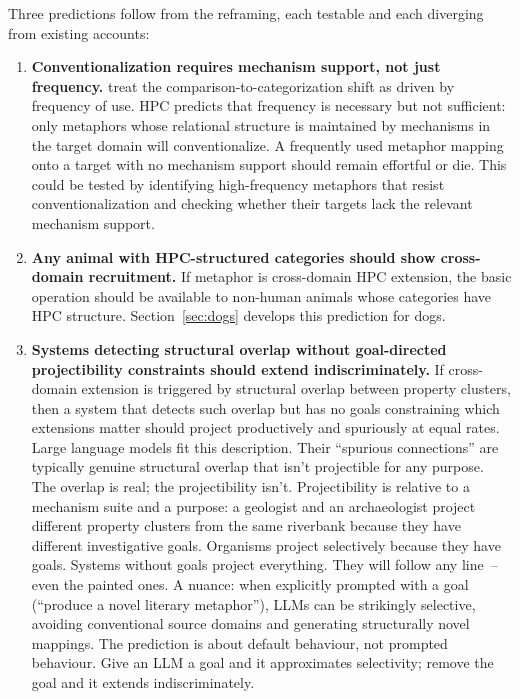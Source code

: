\documentclass[12pt]{article}
\begin{document}
Three predictions follow from the reframing, each testable and each diverging from existing accounts:

\begin{enumerate}
\item \textbf{Conventionalization requires mechanism support, not just frequency.} \textcite{bowdle2005} treat the comparison-to-categorization shift as driven by frequency of use. HPC predicts that frequency is necessary but not sufficient: only metaphors whose relational structure is maintained by mechanisms in the target domain will conventionalize. A frequently used metaphor mapping onto a target with no mechanism support should remain effortful or die. This could be tested by identifying high-frequency metaphors that resist conventionalization and checking whether their targets lack the relevant mechanism support.

\item \textbf{Any animal with HPC-structured categories should show cross-domain recruitment.} If metaphor is cross-domain HPC extension, the basic operation should be available to non-human animals whose categories have HPC structure. Section~\ref{sec:dogs} develops this prediction for dogs.

\item \textbf{Systems detecting structural overlap without goal-directed projectibility constraints should extend indiscriminately.} If cross-domain extension is triggered by structural overlap between property clusters, then a system that detects such overlap but has no goals constraining which extensions matter should project productively and spuriously at equal rates. Large language models fit this description. Their \enquote{spurious connections} are typically genuine structural overlap that isn't projectible for any purpose. The overlap is real; the projectibility isn't. Projectibility is relative to a mechanism suite and a purpose: a geologist and an archaeologist project different property clusters from the same riverbank because they have different investigative goals. Organisms project selectively because they have goals. Systems without goals project everything. They will follow any line~-- even the painted ones. A nuance: when explicitly prompted with a goal (\enquote{produce a novel literary metaphor}), LLMs can be strikingly selective, avoiding conventional source domains and generating structurally novel mappings. The prediction is about default behaviour, not prompted behaviour. Give an LLM a goal and it approximates selectivity; remove the goal and it extends indiscriminately.
\end{enumerate}
\end{document}
